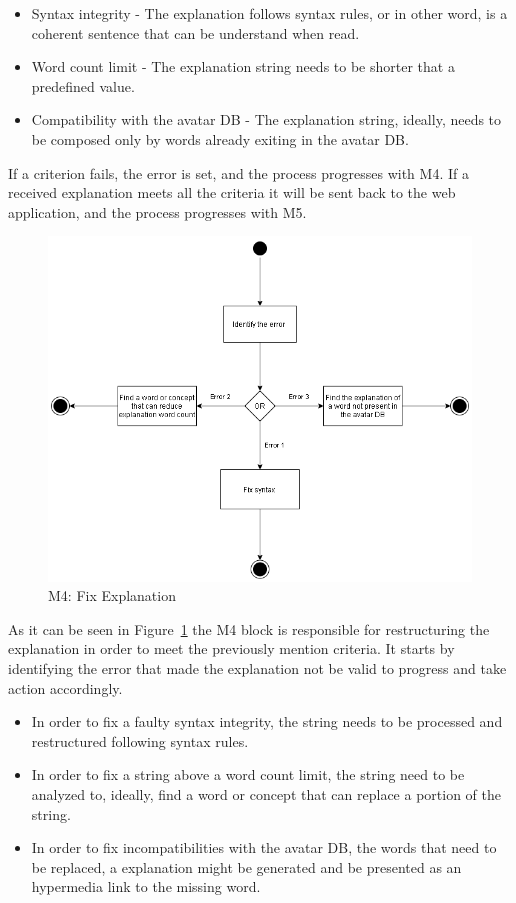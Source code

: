 \begin{itemize}
    \item Syntax integrity - The explanation follows syntax rules, or in other word, is a coherent sentence that can be understand when read.
    \item Word count limit - The explanation string needs to be shorter that a predefined value.
    \item Compatibility with the avatar \gls{DB} - The explanation string, ideally, needs to be composed only by words already exiting in the avatar \gls{DB}.
\end{itemize}

If a criterion fails, the error is set, and the process progresses with M4.
If a received explanation meets all the criteria it will be sent back to the web application, and the process progresses with M5.

\begin{figure}[H]
\centering
\includegraphics[width=\textwidth,keepaspectratio]{ch4/assets/M4.png}
\caption[Fix Explanation Module]{M4: Fix Explanation}
\label{fig:M4}
\end{figure}

As it can be seen in Figure~\ref{fig:M4} the M4 block is responsible for restructuring the explanation in order to meet the previously mention criteria.
It starts by identifying the error that made the explanation not be valid to progress and take action accordingly.

\begin{itemize}
    \item In order to fix a faulty syntax integrity, the string needs to be processed and restructured following syntax rules.
    \item In order to fix a string above a word count limit, the string need to be analyzed to, ideally, find a word or concept that can replace a portion of the string.
    \item In order to fix incompatibilities with the avatar \gls{DB}, the words that need to be replaced, a explanation might be generated and be presented as an hypermedia link to the missing word.
\end{itemize}

